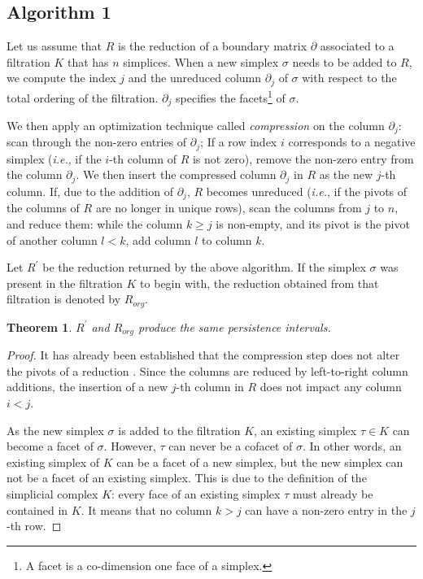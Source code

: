 \documentclass[11pt]{article}
\newtheorem{theorem}{Theorem}[section]
\begin{document}
\subsection{Algorithm 1}

Let us assume that $R$ is the reduction of a boundary matrix $\partial$ associated to a filtration 
$K$ that has $n$ simplices.  When a new simplex $\sigma$ needs to be added to $R$, we compute the 
index $j$ and the unreduced column $\partial_j$ of $\sigma$ with respect to the total ordering of 
the filtration.  $\partial_j$ specifies the facets\footnote{A facet is a co-dimension one face of a 
simplex.} of $\sigma$.

We then apply an optimization technique called \emph{compression} \cite{kerber-18} on the column 
$\partial_j$: scan through the non-zero entries of $\partial_j$; If a row index $i$ corresponds to 
a negative simplex (\emph{i.e.}, if the $i$-th column of $R$ is not zero), remove the non-zero entry
from the column $\partial_j$.  We then insert the compressed column $\partial_j$ in $R$ as the new 
$j$-th column.  If, due to the addition of $\partial_j$, $R$ becomes unreduced (\emph{i.e.}, if the 
pivots of the columns of $R$ are no longer in unique rows), scan the columns from $j$ to $n$, and 
reduce them: while the column $k \geq j$ is non-empty, and its pivot is the pivot of another column 
$l < k$, add column $l$ to column $k$.


Let $R^\prime$ be the reduction returned by the above algorithm.  If the simplex $\sigma$ was 
present in the filtration $K$ to begin with, the reduction obtained from that filtration is denoted 
by $R_{org}$.


\begin{theorem}
	$R^\prime$ and $R_{org}$ produce the same persistence intervals.
\end{theorem}


\begin{proof}
	It has already been established that the compression step does not alter the pivots of a 
	reduction \cite{kerber-18, bauer-14-clear}.  Since the columns are reduced by left-to-right 
	column additions, the insertion of a new $j$-th column in $R$ does not impact any column $i < 
	j$.
	
	As the new simplex $\sigma$ is added to the filtration $K$, an existing simplex $\tau \in K$ 
	can become a facet of $\sigma$.  However, $\tau$ can never be a cofacet of $\sigma$.  In other 
	words, an existing simplex of $K$ can be a facet of a new simplex, but the new simplex can not 
	be a facet of an existing simplex.  This is due to the definition of the simplicial complex 
	$K$: every face of an existing simplex $\tau$ must already be contained in $K$.  It means that 
	no column $k > j$ can have a non-zero entry in the $j$-th row.
\end{proof}




\end{document}
